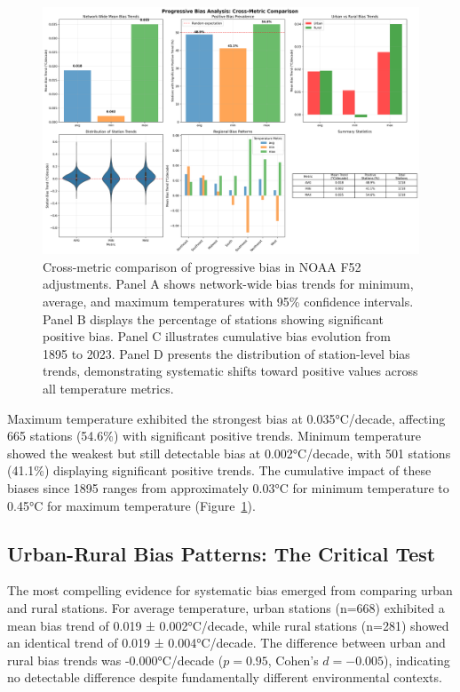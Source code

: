 \documentclass[11pt, a4paper]{article}
\begin{document}
\begin{figure}[htbp]
    \centering
    \includegraphics[width=1.0\textwidth]{figures/cross_metric_comparison.png}
    \caption{Cross-metric comparison of progressive bias in NOAA F52 adjustments. Panel A shows network-wide bias trends for minimum, average, and maximum temperatures with 95\% confidence intervals. Panel B displays the percentage of stations showing significant positive bias. Panel C illustrates cumulative bias evolution from 1895 to 2023. Panel D presents the distribution of station-level bias trends, demonstrating systematic shifts toward positive values across all temperature metrics.}
    \label{fig:cross_metric}
\end{figure}

Maximum temperature exhibited the strongest bias at 0.035°C/decade, affecting 665 stations (54.6\%) with significant positive trends. Minimum temperature showed the weakest but still detectable bias at 0.002°C/decade, with 501 stations (41.1\%) displaying significant positive trends. The cumulative impact of these biases since 1895 ranges from approximately 0.03°C for minimum temperature to 0.45°C for maximum temperature (Figure~\ref{fig:cross_metric}).

\subsection{Urban-Rural Bias Patterns: The Critical Test}

The most compelling evidence for systematic bias emerged from comparing urban and rural stations. For average temperature, urban stations (n=668) exhibited a mean bias trend of 0.019 ± 0.002°C/decade, while rural stations (n=281) showed an identical trend of 0.019 ± 0.004°C/decade. The difference between urban and rural bias trends was -0.000°C/decade ($p = 0.95$, Cohen's $d = -0.005$), indicating no detectable difference despite fundamentally different environmental contexts.
\end{document}
